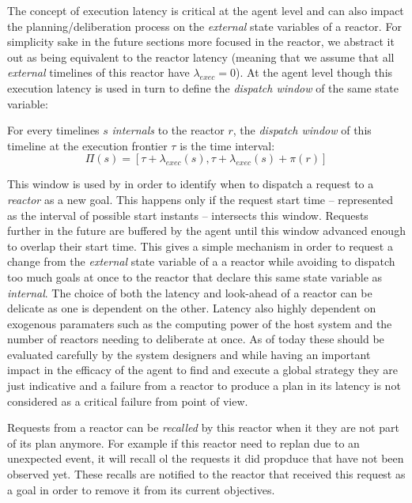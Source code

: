 The concept of execution latency is critical at the agent level
and can also impact the planning/deliberation process on the {\em
  external} state variables of a reactor. For simplicity sake in the
future sections more focused in the \eu reactor, we abstract it out 
as being equivalent to the reactor latency (meaning that we 
assume that all {\em external} timelines of this reactor have
$\lambda_{exec} = 0$). At the \rx agent level though this
 execution latency is used in turn to define the {\em dispatch
window} of the same state variable:
\begin{definition}
  \label{def:dispatch}
  For every timelines $s$ {\em internals} to the reactor $r$, the {\em 
    dispatch window} of this timeline at the execution frontier $\tau$
  is the time interval:
  \begin{equation*}
    \Pi(s) = [\tau + \lambda_{exec}(s), \tau+\lambda_{exec}(s)+\pi(r)]
  \end{equation*}
\end{definition}

This window is used by \rx in order to identify when to dispatch a
request to a {\em reactor} as a new goal. This happens only if the
request start time -- represented as the interval of possible start
instants -- intersects this window. Requests further in the future 
are buffered by the agent until this window advanced enough to 
overlap their start time. This gives a simple mechanism in order to
request a change from the {\em external} state variable of a a reactor 
while avoiding to dispatch too much goals at once to the reactor that
declare this same state variable as {\em internal}. The choice of both
the latency and look-ahead of a reactor can be delicate as one is
dependent on the other. Latency also highly dependent on exogenous
paramaters such as the computing power of the host system and the
number of reactors needing to deliberate at once. As of today these
should be evaluated carefully by the system designers and while
having an important impact in the efficacy of the agent to find and
execute a global strategy they are just indicative and a failure from
a reactor to produce a plan in its latency is not considered as a
critical failure from \rx point of view.

Requests from a reactor can  be {\em recalled} by this reactor when it
they are not part of its plan anymore. For example if this reactor
need to replan due to an unexpected event, it will recall ol the
requests it did propduce that have not been observed yet. These
recalls are notified to the reactor that received this request as a
goal in order to remove it from its current objectives. 

